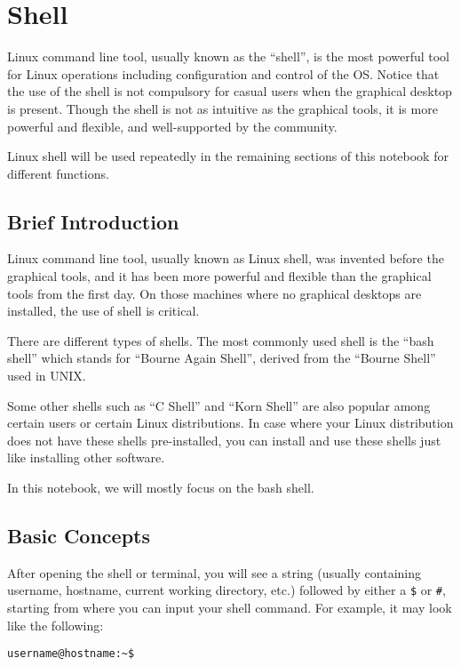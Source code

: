 \chapter{Shell}

Linux command line tool, usually known as the ``shell'', is the most powerful tool for Linux operations including configuration and control of the OS. Notice that the use of the shell is not compulsory for casual users when the graphical desktop is present. Though the shell is not as intuitive as the graphical tools, it is more powerful and flexible, and well-supported by the community.

Linux shell will be used repeatedly in the remaining sections of this notebook for different functions.

\section{Brief Introduction}

Linux command line tool, usually known as Linux shell, was invented before the graphical tools, and it has been more powerful and flexible than the graphical tools from the first day. On those machines where no graphical desktops are installed, the use of shell is critical.

There are different types of shells. The most commonly used shell is the ``bash shell'' which stands for ``Bourne Again Shell'', derived from the ``Bourne Shell'' used in UNIX.

Some other shells such as ``C Shell'' and ``Korn Shell'' are also popular among certain users or certain Linux distributions. In case where your Linux distribution does not have these shells pre-installed, you can install and use these shells just like installing other software.

In this notebook, we will mostly focus on the bash shell.

\section{Basic Concepts}

After opening the shell or terminal, you will see a string (usually containing username, hostname, current working directory, etc.) followed by either a \verb|$| or \verb|#|, starting from where you can input your shell command. For example, it may look like the following:
\begin{verbatim}
username@hostname:~$
\end{verbatim}

